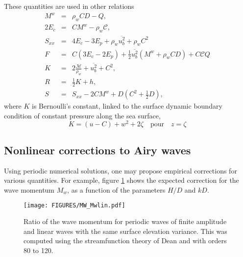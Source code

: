 These quantities are used in other relations 
\begin{eqnarray}
M^w&=&\rho_w C D - Q, \\
2 E_c &=& C M^w - \rho_w \mathcal{C} , \\
S_{xx}&=&4 E_c - 3 E_p+\rho_w \overline{u_b^2}+\rho_w C^2 \\
F&=& C \left(3 E_c - 2 E_p\right)+\frac{1}{2}
\overline{u_b^2}\left(M^w+\rho_w C D\right) + C\mathcal{C}Q \\
K&=&2 \frac{\mathcal{M}}{\rho_w}+\overline{u_b^2}+C^2, \\
R&=&\frac{1}{2}K + h, \\
S&=&S_{xx}-2C M^w +D \left(C^2+\frac{1}{2}D\right),
\end{eqnarray}
where $K$ is Bernoulli's constant, linked to the surface dynamic boundary condition of constant pressure along the sea surface,
\begin{equation}
K=\left(u-C\right)+w^2 + 2 \zeta \quad \mathrm{pour} \quad
z=\zeta
\end{equation}

\subsection{Nonlinear corrections to Airy waves}
Using periodic numerical solutions, one may propose empirical corrections for various quantities. For example, 
figure \ref{Mwfig} shows the expected correction for the wave momentum $M_w$, as a function of the  parameters $H/D$  and $kD$.

\begin{figure}
\centerline{\texttt{[image: FIGURES/MW\_Mwlin.pdf]}}
\caption{Ratio of the wave momentum for periodic waves of finite amplitude and linear waves with the same surface elevation variance. This was computed 
using the streamfunction theory of Dean and \cite{Dalrymple1974} with orders 80 to 120.} \label{Mwfig}
\end{figure}





